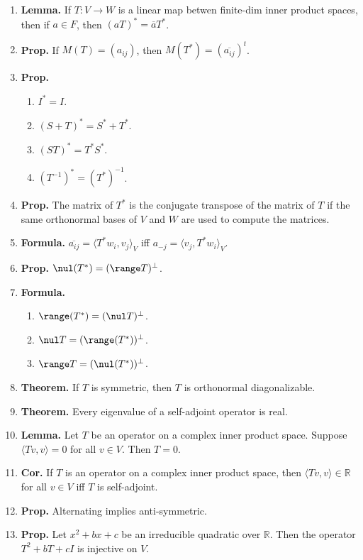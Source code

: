 \begin{enumerate}
	\item \textbf{Lemma. } If $T: V \to W$ is a linear map betwen finite-dim inner product spaces, then if $a \in F$, then $(aT)^* = \overline{a}T^*$. 
	\item \textbf{Prop. } If $M(T) = (a_{ij})$, then $M(T^*) = (\overline{a_{ij}})^t$. 
	\item \textbf{Prop. } 
	\begin{enumerate}
		\item $I^* = I$. 
		\item $(S+T)^* = S^* + T^*$. 
		\item $(ST)^* = T^*S^*$. 
		\item $(T^{-1})^* = (T^*)^{-1}$. 
	\end{enumerate}
	\item \textbf{Prop. } The matrix of $T^*$ is the conjugate transpose of the matrix of $T$ if the same orthonormal bases of $V$ and $W$ are used to compute the matrices. 
	\item \textbf{Formula. } $\overline{a_{ij}} = \langle T^*w_i, v_j \rangle_V$ iff $a_{-j} = \langle v_j, T^*w_i \rangle_V$. 
	\item \textbf{Prop. } $\nul (T^*) = (\range T)^\perp$. 
	\item \textbf{Formula. } 
	\begin{enumerate}
		\item $\range (T^*) = (\nul T)^\perp$. 
		\item $\nul T = (\range(T^*))^\perp$. 
		\item $\range T = (\nul(T^*))^\perp$. 
	\end{enumerate}
	\item \textbf{Theorem. } If $T$ is symmetric, then $T$ is orthonormal diagonalizable. 
	\item \textbf{Theorem. } Every eigenvalue of a self-adjoint operator is real. 
	\item \textbf{Lemma. } Let $T$ be an operator on a complex inner product space. Suppose $\langle Tv,v \rangle = 0$ for all $v \in V$. Then $T=0$. 
	\item \textbf{Cor. } If $T$ is an operator on a complex inner product space, then $\langle Tv,v \rangle \in \mathbb{R}$ for all $v \in V$ iff $T$ is self-adjoint. 
	\item \textbf{Prop. } Alternating implies anti-symmetric. 
	\item \textbf{Prop. } Let $x^2 + bx + c$ be an irreducible quadratic over $\mathbb{R}$. Then the operator $T^2 + bT + cI$ is injective on $V$. 
\end{enumerate}


